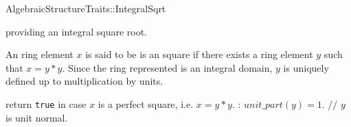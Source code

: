 

\begin{ccRefConcept}{AlgebraicStructureTraits::IntegralSqrt}

\begin{ccAdvanced}
\ccDefinition

 providing an integral square root. 

An ring element $x$ is said to be is an square if there exists a ring element $y$ such 
that $x= y*y$. Since the ring represented is an integral domain, 
$y$ is uniquely defined up to multiplication by units. 

\ccRefines 


\ccTypes

\ccGlue
{}\ccGlue
{}

\ccOperations

        { return {\tt true} in case $x$ is a perfect square, i.e. $x = y*y$.
          \ccPostcond: $unit\_part(y) = 1$. // $y$ is unit normal. 
        }


\ccSeeAlso

\end{ccAdvanced}

\end{ccRefConcept} 